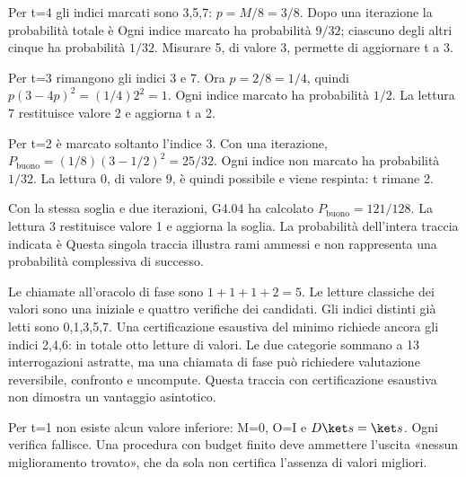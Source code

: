 \ExSolution


Per t=4 gli indici marcati sono 3,5,7: \(p=M/8=3/8\). Dopo una iterazione la probabilità totale è
Ogni indice marcato ha probabilità \(9/32\); ciascuno degli altri cinque ha probabilità \(1/32\). Misurare 5, di valore 3, permette di aggiornare t a 3.


Per t=3 rimangono gli indici 3 e 7. Ora \(p=2/8=1/4\), quindi \(p(3-4p)^2=(1/4)2^2=1\). Ogni indice marcato ha probabilità \(1/2\). La lettura 7 restituisce valore 2 e aggiorna t a 2.


Per t=2 è marcato soltanto l’indice 3. Con una iterazione, \(P_{\mathrm{buono}}=(1/8)(3-1/2)^2=25/32\). Ogni indice non marcato ha probabilità \(1/32\). La lettura 0, di valore 9, è quindi possibile e viene respinta: t rimane 2.


Con la stessa soglia e due iterazioni, G4.04 ha calcolato \(P_{\mathrm{buono}}=121/128\). La lettura 3 restituisce valore 1 e aggiorna la soglia. La probabilità dell’intera traccia indicata è
Questa singola traccia illustra rami ammessi e non rappresenta una probabilità complessiva di successo.


Le chiamate all’oracolo di fase sono \(1+1+1+2=5\). Le letture classiche dei valori sono una iniziale e quattro verifiche dei candidati. Gli indici distinti già letti sono 0,1,3,5,7. Una certificazione esaustiva del minimo richiede ancora gli indici 2,4,6: in totale otto letture di valori. Le due categorie sommano a 13 interrogazioni astratte, ma una chiamata di fase può richiedere valutazione reversibile, confronto e uncompute. Questa traccia con certificazione esaustiva non dimostra un vantaggio asintotico.


Per t=1 non esiste alcun valore inferiore: M=0, O=I e \(D\ket s=\ket s\). Ogni verifica fallisce. Una procedura con budget finito deve ammettere l’uscita «nessun miglioramento trovato», che da sola non certifica l’assenza di valori migliori.

